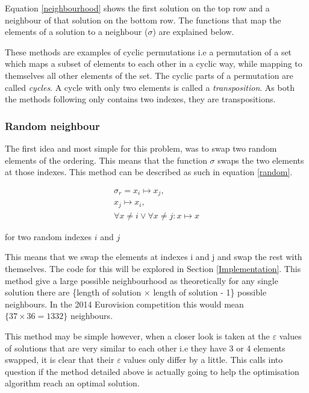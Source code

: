 \documentclass[12pt]{report}
\begin{document}
Equation \ref{neighbourhood} shows the first solution on the top row and a neighbour of that solution on the bottom row. The functions that map the elements of a solution to a neighbour ($\sigma$) are explained below.

These methods are examples of cyclic permutations i.e a permutation of a set which maps a subset of elements to each other in a cyclic way, while mapping to themselves all other elements of the set. The cyclic parts of a permutation are called \textit{cycles}. A cycle with only two elements is called a \textit{transposition}\cite{cyclicPerm}. As both the methods following only contains two indexes, they are transpositions.

\subsubsection{Random neighbour}
The first idea and most simple for this problem, was to swap two random elements of the ordering. This means that the function $\sigma$ swaps the two elements at those indexes. This method can be described as such in equation \ref{random}.

\begin{equation}\label{random}
\begin{split}
	\sigma_r = x_i \mapsto x_j,\\ x_j \mapsto x_i,\\ \forall x \neq i \lor \forall x \neq j: x \mapsto x
\end{split}
\end{equation}

for two random indexes $i$ and $j$

This means that we swap the elements at indexes i and j and swap the rest with themselves. The code for this will be explored in Section \ref{Implementation}. This method give a large possible neighbourhood as theoretically for any single solution there are \{length of solution $\times$ length of solution - 1\} possible neighbours. In the 2014 Eurovision competition this would mean $\{37 \times 36 = 1332\}$ neighbours.

This method may be simple however, when a closer look is taken at the $\varepsilon$ values of solutions that are very similar to each other i.e they have 3 or 4 elements swapped, it is clear that their $\varepsilon$ values only differ by a little. This calls into question if the method detailed above is actually going to help the optimisation algorithm reach an optimal solution.
\end{document}
